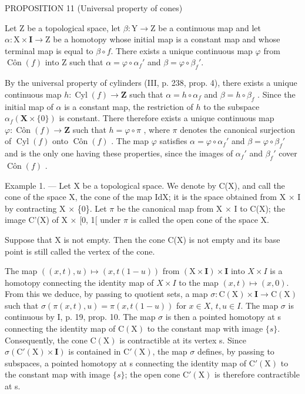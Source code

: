 PROPOSITION 11 (Universal property of cones)

Let Z be a topological space, let \(\beta: \mathrm{Y} \to \mathrm{Z}\) be a continuous map and let \(\alpha: \mathrm{X} \times \mathbf{I} \to \mathrm{Z}\) be a homotopy whose initial map is a constant map and whose terminal map is equal to \(\beta \circ f\). There exists a unique continuous map \(\varphi\) from \(\operatorname{Côn}(f)\) into Z such that \(\alpha = \varphi \circ \alpha_f'\) and \(\beta = \varphi \circ \beta_f'\).

By the universal property of cylinders (III, p. 238, prop. 4), there exists a unique continuous map \(h \colon \operatorname{Cyl}(f) \to \mathbf{Z}\) such that \(\alpha = h \circ \alpha_f\) and \(\beta = h \circ \beta_f\) . Since the initial map of \(\alpha\) is a constant map, the restriction of \(h\) to the subspace \(\alpha_f(\mathbf{X} \times \{0\})\) is constant. There therefore exists a unique continuous map \(\varphi \colon \operatorname{Côn}(f) \to \mathbf{Z}\) such that \(h = \varphi \circ \pi\) , where \(\pi\) denotes the canonical surjection of \(\operatorname{Cyl}(f)\) onto \(\operatorname{Côn}(f)\) . The map \(\varphi\) satisfies \(\alpha = \varphi \circ \alpha_f'\) and \(\beta = \varphi \circ \beta_f'\) and is the only one having these properties, since the images of \(\alpha_f'\) and \(\beta_f'\) cover \(\operatorname{Côn}(f)\) .

Example 1. --- Let X be a topological space. We denote by C(X), and call the cone of the space X, the cone of the map IdX; it is the space obtained from X × I by contracting X × \{0\}. Let \(\pi\) be the canonical map from X × I to C(X); the image C'(X) of X × {[}0, 1{[} under \(\pi\) is called the open cone of the space X.

Suppose that X is not empty. Then the cone C(X) is not empty and its base point is still called the vertex of the cone.

The map \(((x,t),u)\mapsto(x,t(1-u))\) from \((\mathrm{X}\times\mathbf{I})\times\mathbf{I}\) into \(X\times I\) is a homotopy connecting the identity map of \(X\times I\) to the map \((x,t)\mapsto(x,0)\). From this we deduce, by passing to quotient sets, a map \(\sigma\colon\mathrm{C}(\mathrm{X})\times\mathbf{I}\to\mathrm{C}(\mathrm{X})\) such that \(\sigma(\pi(x,t),u)=\pi(x,t(1-u))\) for \(x\in X\), \(t,u\in I\). The map \(\sigma\) is continuous by I, p. 19, prop. 10. The map \(\sigma\) is then a pointed homotopy at s connecting the identity map of \(\mathrm{C}(\mathrm{X})\) to the constant map with image \(\{s\}\). Consequently, the cone \(\mathrm{C}(\mathrm{X})\) is contractible at its vertex s. Since \(\sigma(\mathrm{C}'(\mathrm{X})\times\mathbf{I})\) is contained in \(\mathrm{C}'(\mathrm{X})\), the map \(\sigma\) defines, by passing to subspaces, a pointed homotopy at s connecting the identity map of \(\mathrm{C}'(\mathrm{X})\) to the constant map with image \(\{s\}\); the open cone \(\mathrm{C}'(\mathrm{X})\) is therefore contractible at s.

